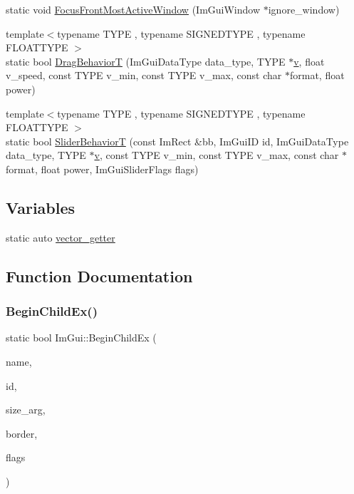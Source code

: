 \begin{DoxyCompactItemize}
\item 
static void \mbox{\hyperlink{namespace_im_gui_adc356b6245da18540e77f663c6cee813}{Focus\+Front\+Most\+Active\+Window}} (Im\+Gui\+Window $\ast$ignore\+\_\+window)
\item 
{\footnotesize template$<$typename T\+Y\+PE , typename S\+I\+G\+N\+E\+D\+T\+Y\+PE , typename F\+L\+O\+A\+T\+T\+Y\+PE $>$ }\\static bool \mbox{\hyperlink{namespace_im_gui_adfdce5dc614de9fe81b3e50c53b8f5df}{Drag\+BehaviorT}} (Im\+Gui\+Data\+Type data\+\_\+type, T\+Y\+PE $\ast$\mbox{\hyperlink{main_8cpp_a6355d41788bff5386a6854b1fd02ab9b}{v}}, float v\+\_\+speed, const T\+Y\+PE v\+\_\+min, const T\+Y\+PE v\+\_\+max, const char $\ast$format, float power)
\item 
{\footnotesize template$<$typename T\+Y\+PE , typename S\+I\+G\+N\+E\+D\+T\+Y\+PE , typename F\+L\+O\+A\+T\+T\+Y\+PE $>$ }\\static bool \mbox{\hyperlink{namespace_im_gui_addfe850a41dd51c7d0d7ac06742133db}{Slider\+BehaviorT}} (const Im\+Rect \&bb, Im\+Gui\+ID id, Im\+Gui\+Data\+Type data\+\_\+type, T\+Y\+PE $\ast$\mbox{\hyperlink{main_8cpp_a6355d41788bff5386a6854b1fd02ab9b}{v}}, const T\+Y\+PE v\+\_\+min, const T\+Y\+PE v\+\_\+max, const char $\ast$format, float power, Im\+Gui\+Slider\+Flags flags)
\end{DoxyCompactItemize}
\subsection*{Variables}
\begin{DoxyCompactItemize}
\item 
static auto \mbox{\hyperlink{namespace_im_gui_a60811991fd9baf2b2f86bd99efd4b741}{vector\+\_\+getter}}
\end{DoxyCompactItemize}


\subsection{Function Documentation}
\mbox{\label{namespace_im_gui_a2859716218e80788a82e6f76c5cf19b9}} 
\subsubsection{\texorpdfstring{Begin\+Child\+Ex()}{BeginChildEx()}}
{\footnotesize\ttfamily static bool Im\+Gui\+::\+Begin\+Child\+Ex (\begin{DoxyParamCaption}\item[{const char $\ast$}]{name,  }\item[{Im\+Gui\+ID}]{id,  }\item[{const Im\+Vec2 \&}]{size\+\_\+arg,  }\item[{bool}]{border,  }\item[{Im\+Gui\+Window\+Flags}]{flags }\end{DoxyParamCaption})\hspace{0.3cm}{\ttfamily [static]}}

